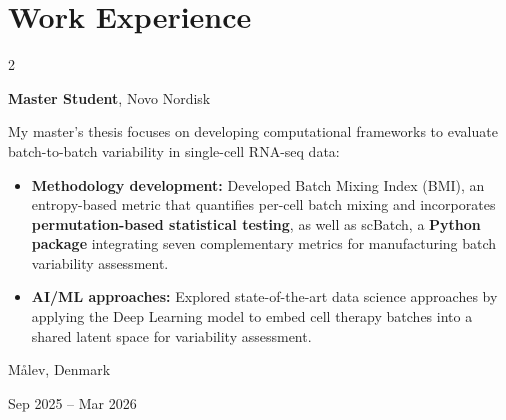 \documentclass[10pt, letterpaper]{article}
\newenvironment{highlights}{
    \begin{itemize}[
        topsep=0.10 cm,
        parsep=0.10 cm,
        partopsep=0pt,
        itemsep=0pt,
        leftmargin=0.4 cm + 10pt
    ]
}{
    \end{itemize}
} %
\newenvironment{twocolentry}[2][]{
    \onecolentry
    \def\secondColumn{#2}
    \setcolumnwidth{\fill, 4.5 cm}
    \begin{paracol}{2}
}{
    \switchcolumn \raggedleft \secondColumn
    \end{paracol}
    \endonecolentry
} %
\begin{document}
    


    
    \section{Work Experience}

        \begin{twocolentry}{
    Målev, Denmark

    Sep 2025 – Mar 2026
}
    \textbf{Master Student}, Novo Nordisk

    \vspace{0.1cm}
    
     My master’s thesis focuses on developing computational frameworks to evaluate batch-to-batch variability in single-cell RNA-seq data:

    \begin{highlights}
        \item \textbf{Methodology development:} Developed Batch Mixing Index (BMI), an entropy-based metric that quantifies per-cell batch mixing and incorporates \textbf{permutation-based statistical testing}, as well as scBatch, a \textbf{Python package} integrating seven complementary metrics for manufacturing batch variability assessment.

        \vspace{0.1cm}

        \item \textbf{AI/ML approaches:} Explored state-of-the-art data science approaches by applying the Deep Learning model to embed cell therapy batches into a shared latent space for variability assessment.

        \vspace{0.1cm}

    \end{highlights}
\end{twocolentry}
\end{document}
